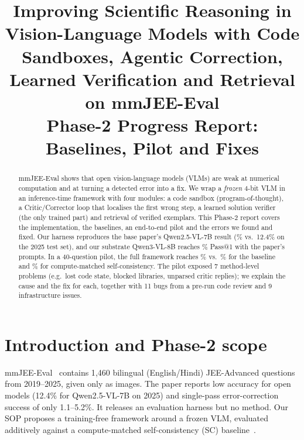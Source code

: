 \documentclass[conference]{IEEEtran}
\begin{document}
\title{Improving Scientific Reasoning in Vision-Language Models with Code Sandboxes, Agentic
Correction, Learned Verification and Retrieval on mmJEE-Eval\\[2pt]
\large Phase-2 Progress Report: Baselines, Pilot and Fixes}
\author{
}
\maketitle

\begin{abstract}
mmJEE-Eval shows that open vision-language models (VLMs) are weak at numerical computation and
at turning a detected error into a fix. We wrap a \emph{frozen} 4-bit VLM in an inference-time
framework with four modules: a code sandbox (program-of-thought), a Critic/Corrector loop that
localises the first wrong step, a learned solution verifier (the only trained part) and retrieval
of verified exemplars. This Phase-2 report covers the implementation, the baselines, an
end-to-end pilot and the errors we found and fixed. Our harness reproduces the base paper's
Qwen2.5-VL-7B result (\ReproAcc\% vs.\ 12.4\% on the 2025 test set), and our substrate
Qwen3-VL-8B reaches \BaseAcc\% Pass@1 with the paper's prompts. In a 40-question pilot, the full
framework reaches \PilotFull\% vs.\ \PilotBase\% for the baseline and \PilotSc\% for
compute-matched self-consistency. The pilot exposed 7 method-level problems (e.g.\ lost code
state, blocked libraries, unparsed critic replies); we explain the cause and the fix for each,
together with 11 bugs from a pre-run code review and 9 infrastructure issues.
\end{abstract}

\section{Introduction and Phase-2 scope}
mmJEE-Eval~\cite{mmjee} contains 1{,}460 bilingual (English/Hindi) JEE-Advanced questions from
2019--2025, given only as images. The paper reports low accuracy for open models (12.4\% for
Qwen2.5-VL-7B on 2025) and single-pass error-correction success of only 1.1--5.2\%. It releases
an evaluation harness but no method. Our SOP proposes a training-free framework around a frozen
VLM, evaluated additively against a compute-matched self-consistency (SC)
baseline~\cite{selfconsistency}.
\end{document}
